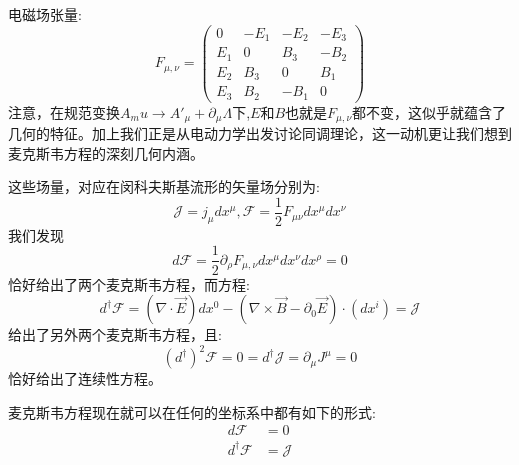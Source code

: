 \documentclass[supercite]{HustGraduPaper}
\begin{document}
电磁场张量:
\begin{equation}
F_{\mu,\nu} = \left(\begin{array}{cccc}
0 & -E_1 & -E_2 & -E_3 \\ 
E_1 & 0 & B_3 & -B_2 \\ 
E_2 & B_3 & 0 & B_1 \\ 
E_3 & B_2 & -B_1 & 0
\end{array} \right)
\end{equation}
注意，在规范变换$A_mu \to A'_\mu + \partial_\mu \Lambda$下,$E$和$B$也就是$F_{\mu,\nu}$都不变，这似乎就蕴含了几何的特征。加上我们正是从电动力学出发讨论同调理论，这一动机更让我们想到麦克斯韦方程的深刻几何内涵。

这些场量，对应在闵科夫斯基流形的矢量场分别为:
\begin{equation}
\mathcal{J} = j_\mu dx^\mu, \mathcal{F} = \frac{1}{2}F_{\mu\nu} dx^\mu dx^\nu
\end{equation}
我们发现
\begin{equation}
d\mathcal{F} = \frac{1}{2} \partial_\rho F_{\mu,\nu} dx^\mu dx^\nu dx^\rho = 0
\end{equation}
恰好给出了两个麦克斯韦方程，而方程:
\begin{equation}
d^\dagger \mathcal{F} = (\nabla \cdot \vec{E}) dx^0 - (\nabla \times \vec{B} - \partial_0 \vec{E}) \cdot (dx^i) = \mathcal{J}
\end{equation}
给出了另外两个麦克斯韦方程，且:
\begin{equation}
(d^\dagger)^2 \mathcal{F} = 0 = d^\dagger \mathcal{J} = \partial_\mu J^\mu = 0
\end{equation}
恰好给出了连续性方程。

麦克斯韦方程现在就可以在任何的坐标系中都有如下的形式:
\begin{equation}
\begin{aligned}
 d\mathcal{F} &= 0\\
d^\dagger \mathcal{F} &= \mathcal{J}
\end{aligned}
\end{equation}
\end{document}
